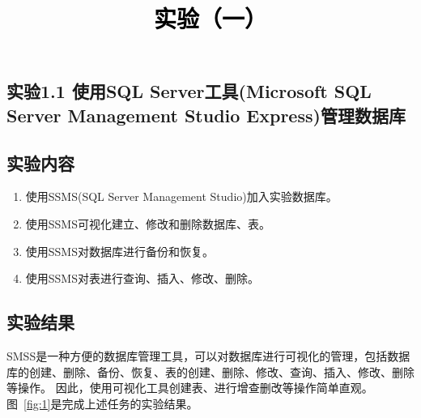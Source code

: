 \documentclass[a4paper,twoside]{article}
\newcommand{\PaperTitle}{实验（一）}  %
\begin{document}
\newpage

\title{
	\Large{\textcolor{black}{\PaperTitle}}
}
	
	
\maketitle
	
\tableofcontents
 
\newpage
\setcounter{page}{1}

\begin{spacing}{1.2}

\section{实验1.1 使用SQL Server工具(Microsoft SQL Server Management Studio Express)管理数据库}

\subsection{实验内容}

\begin{enumerate}
    \item 使用SSMS(SQL Server Management Studio)加入实验数据库。
    \item 使用SSMS可视化建立、修改和删除数据库、表。
    \item 使用SSMS对数据库进行备份和恢复。
    \item 使用SSMS对表进行查询、插入、修改、删除。  
\end{enumerate}

\subsection{实验结果}

SMSS是一种方便的数据库管理工具，可以对数据库进行可视化的管理，包括数据库的创建、删除、备份、恢复、表的创建、删除、修改、查询、插入、修改、删除等操作。
因此，使用可视化工具创建表、进行增查删改等操作简单直观。图~\ref{fig:1}是完成上述任务的实验结果。


\end{spacing}
\end{document}
